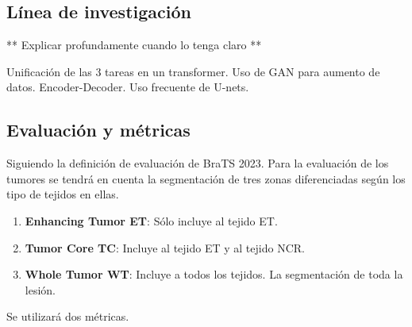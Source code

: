 \subsection{Línea de investigación}

** Explicar profundamente cuando lo tenga claro **

Unificación de las 3 tareas en un transformer. Uso de GAN para aumento de datos. Encoder-Decoder. Uso frecuente de U-nets.

\subsection{Evaluación y métricas}


Siguiendo la definición de evaluación de BraTS 2023. Para la evaluación de los tumores se tendrá en cuenta la segmentación de tres zonas diferenciadas según los tipo de tejidos en ellas.

\begin{enumerate}
	\item \textbf{Enhancing Tumor ET}: Sólo incluye al tejido ET.
	\item \textbf{Tumor Core TC}: Incluye al tejido ET y al tejido NCR.
	\item \textbf{Whole Tumor WT}: Incluye a todos los tejidos. La segmentación de toda la lesión.
\end{enumerate}


Se utilizará dos métricas. 

